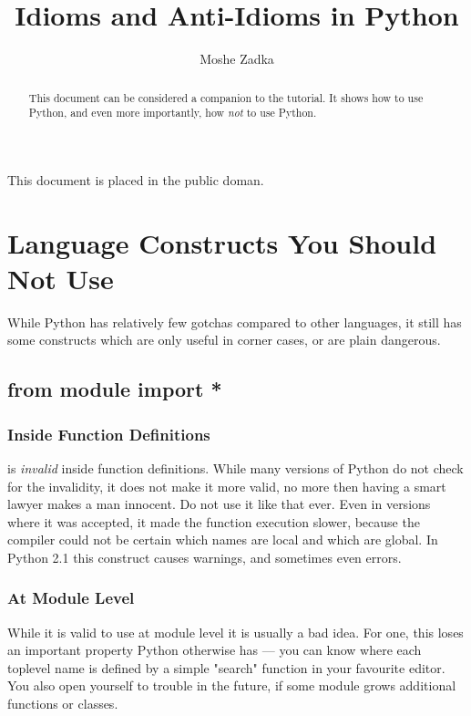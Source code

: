 \documentclass{howto}
\title{Idioms and Anti-Idioms in Python}
\author{Moshe Zadka}
\begin{document}
\maketitle

This document is placed in the public doman.

\begin{abstract}
\noindent
This document can be considered a companion to the tutorial. It
shows how to use Python, and even more importantly, how {\em not}
to use Python. 
\end{abstract}

\tableofcontents

\section{Language Constructs You Should Not Use}

While Python has relatively few gotchas compared to other languages, it
still has some constructs which are only useful in corner cases, or are
plain dangerous. 

\subsection{from module import *}

\subsubsection{Inside Function Definitions}

 is {\em invalid} inside function definitions.
While many versions of Python do not check for the invalidity, it does not
make it more valid, no more then having a smart lawyer makes a man innocent.
Do not use it like that ever. Even in versions where it was accepted, it made
the function execution slower, because the compiler could not be certain
which names are local and which are global. In Python 2.1 this construct
causes warnings, and sometimes even errors.

\subsubsection{At Module Level}

While it is valid to use  at module level it
is usually a bad idea. For one, this loses an important property Python
otherwise has --- you can know where each toplevel name is defined by
a simple "search" function in your favourite editor. You also open yourself
to trouble in the future, if some module grows additional functions or
classes. 
\end{document}
